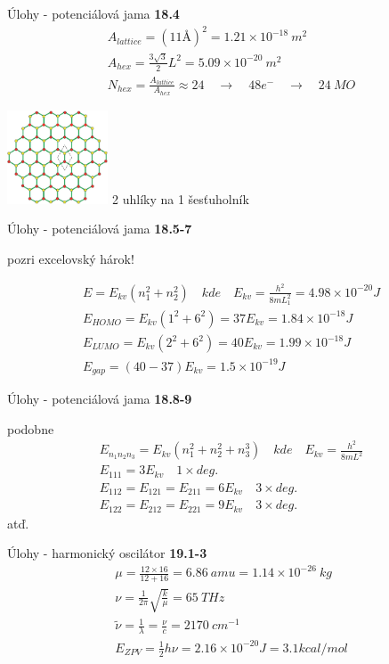 \documentclass{beamer}
\begin{document}
\begin{frame}{Úlohy - potenciálová jama}
\textbf{18.4}
\begin{align*}
A_{lattice} = (11 \text{\AA})^2 = 1.21 \times 10^{-18} \: m^2\\
A_{hex} = \frac{3\sqrt{3}}{2}L^2 = 5.09 \times 10^{-20} \: m^2\\
N_{hex} = \frac{A_{lattice}}{A_{hex}} \approx 24 \quad \rightarrow \quad 48 e^- \quad \rightarrow \quad 24 \: MO
\end{align*} 

\includegraphics[width=3cm]{hex_lattice.png} 2 uhlíky na 1 šesťuholník
\end{frame}

\begin{frame}{Úlohy - potenciálová jama}
\textbf{18.5-7}

pozri excelovský hárok!

\begin{align*}
E=E_{kv}(n_1^2+n_2^2) \quad kde \quad E_{kv}=\frac{h^2}{8mL_1^2}=4.98 \times 10^{-20} J \\
E_{HOMO}=E_{kv}(1^2+6^2)=37 E_{kv} = 1.84 \times 10^{-18} J \\
E_{LUMO}=E_{kv}(2^2+6^2)=40 E_{kv} = 1.99 \times 10^{-18} J \\
E_{gap}=(40-37)E_{kv} = 1.5 \times 10^{-19} J
\end{align*} 
\end{frame}


\begin{frame}{Úlohy - potenciálová jama}
\textbf{18.8-9}

podobne
\begin{align*}
E_{n_1n_2n_3}=E_{kv}(n_1^2+n_2^2+n_3^3) \quad kde \quad E_{kv}=\frac{h^2}{8mL^2} \\
E_{111}=3E_{kv} \quad 1\times deg.\\
E_{112}=E_{121}=E_{211}=6E_{kv} \quad 3\times deg.\\
E_{122}=E_{212}=E_{221}=9E_{kv} \quad 3\times deg.
\end{align*} 
atď.
\end{frame}


\begin{frame}{Úlohy - harmonický oscilátor}
\textbf{19.1-3}
\begin{align*}
\mu = \frac{12 \times 16 }{12+16} = 6.86\: amu = 1.14 \times 10^{-26} \: kg\\
\nu = \frac{1}{2\pi}\sqrt{\frac{k}{\mu}} = 65 \: THz \\
\tilde{\nu}=\frac{1}{\lambda}=\frac{\nu}{c}=2170 \: cm^{-1} \\
E_{ZPV}=\frac{1}{2}h\nu=2.16\times 10^{-20} J = 3.1 kcal/mol
\end{align*}
\end{frame}
\end{document}
